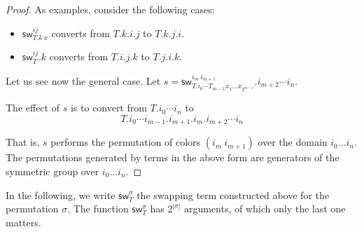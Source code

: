 \documentclass[10pt,a4paper]{article}
\newcommand\sw[2]{\mathsf{sw}^{#1}_{#2}}
\begin{document}
\begin{proof}
As examples, consider the following cases:
\begin{itemize}
\item $\sw{ij} {T.k~x}$ converts from $T.k.i.j$ to $T.k.j.i$.
\item $\sw{ij} {T}.k$ converts from $T.i.j.k$ to $T.j.i.k$.
\end{itemize}

Let us see now the general case.
Let $s = \sw{i_m~i_{m+1}} {T.i_0⋯T_{m-1} x_1 … x_{2^{m-1}}}.i_{m+2}⋯i_n$.

The effect of $s$ is to convert from $T.i_0 ⋯ i_n$ to
$$T.i_0⋯i_{m-1}.i_{m+1}.i_m .i_{m+2}⋯i_n$$

That is, $s$ performs the permutation of colors $(i_m~i_{m+1})$ over
the domain $i_0 … i_n$. The permutations generated by terms in the
above form are generators of the symmetric group over $i_0 … i_n$.
\end{proof}

In the following, we write $\sw {σ} T$ the swapping term constructed
above for the permutation $σ$. The function $\sw {σ} T$ has $2^{|σ|}$
arguments, of which only the last one matters.
\end{document}
